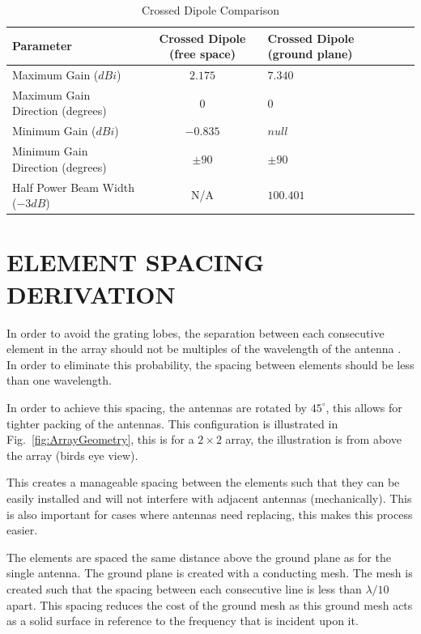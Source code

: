 \documentclass[11pt]{witseiepaper}
\begin{document}
\begin{bibunit}[witseie]
\begin{table}[htb]
    \caption{Crossed Dipole Comparison}
    \label{tab:AntennaConfigurations}
    \begin{center}
        \begin{tabular}{p{60mm}cp{40mm}cp{40mm}}
            \hline 
            Parameter & Crossed Dipole (free space) & Crossed Dipole (ground plane) \\
            \hline
            Maximum Gain ($dBi$) & $2.175$ & $7.340$ \\
            Maximum Gain Direction (degrees) & $0$ & $0$ \\
            Minimum Gain ($dBi$) & $-0.835$ & $null$ \\
            Minimum Gain Direction (degrees) & $\pm 90$ & $\pm 90$ \\
            Half Power Beam Width ($-3 dB$) & N/A & $100.401$ \\
            \hline
        \end{tabular}
    \end{center}
\end{table}

\section{ELEMENT SPACING DERIVATION} \label{sec:ElementSpacingDerivation}
In order to avoid the grating lobes, the separation between each consecutive element in the array should not be multiples of the wavelength of the antenna \cite[p.~297]{Balanis}.
In order to eliminate this probability, the spacing between elements should be less than one wavelength.

In order to achieve this spacing, the antennas are rotated by $45^{\circ}$, this allows for tighter packing of the antennas. This configuration is illustrated in Fig.~\ref{fig:ArrayGeometry}, this is for a $2 \times 2$ array, the illustration is from above the array (birds eye view).

This creates a manageable spacing between the elements such that they can be easily installed and will not interfere with adjacent antennas (mechanically). This is also important for cases where antennas need replacing, this makes this process easier.

The elements are spaced the same distance above the ground plane as for the single antenna. The ground plane is created with a conducting mesh. The mesh is created such that the spacing between each consecutive line is less than $\lambda/10$ apart. This spacing reduces the cost of the ground mesh as this ground mesh acts as a solid surface in reference to the frequency that is incident upon it.


\end{bibunit}
\end{document}
